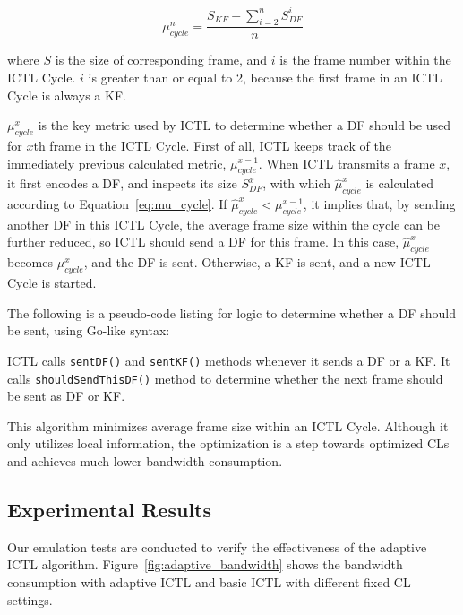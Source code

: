 \documentclass[12pt]{report}
\begin{document}
\begin{equation}
  \mu_{cycle}^n = \frac{S_{KF} + \sum_{i=2}^{n}{S_{DF}^i}}{n}
  \label{eq:mu_cycle}
\end{equation}

where $S$ is the size of corresponding frame, and $i$ is the frame number within the ICTL Cycle. $i$ is greater than or equal to 2, because the first frame in an ICTL Cycle is always a KF.

$\mu_{cycle}^x$ is the key metric used by ICTL to determine whether a DF should be used for $x$th frame in the ICTL Cycle. First of all, ICTL keeps track of the immediately previous calculated metric, $\mu_{cycle}^{x-1}$. When ICTL transmits a frame $x$, it first encodes a DF, and inspects its size $S_{DF}^x$, with which $\hat{\mu}_{cycle}^x$ is calculated according to Equation~\ref{eq:mu_cycle}. If $\hat{\mu}_{cycle}^x < \mu_{cycle}^{x-1}$, it implies that, by sending another DF in this ICTL Cycle, the average frame size within the cycle can be further reduced, so ICTL should send a DF for this frame. In this case, $\hat{\mu}_{cycle}^x$ becomes $\mu_{cycle}^x$, and the DF is sent. Otherwise, a KF is sent, and a new ICTL Cycle is started.

The following is a pseudo-code listing for logic to determine whether a DF should be sent, using Go-like syntax:

\begin{singlespace}
  
\end{singlespace}

ICTL calls \texttt{sentDF()} and \texttt{sentKF()} methods whenever it sends a DF or a KF. It calls \texttt{shouldSendThisDF()} method to determine whether the next frame should be sent as DF or KF.

This algorithm minimizes average frame size within an ICTL Cycle. Although it only utilizes local information, the optimization is a step towards optimized CLs and achieves much lower bandwidth consumption.

\subsection{Experimental Results}

Our emulation tests are conducted to verify the effectiveness of the adaptive ICTL algorithm. Figure~\ref{fig:adaptive_bandwidth} shows the bandwidth consumption with adaptive ICTL and basic ICTL with different fixed CL settings.
\end{document}
